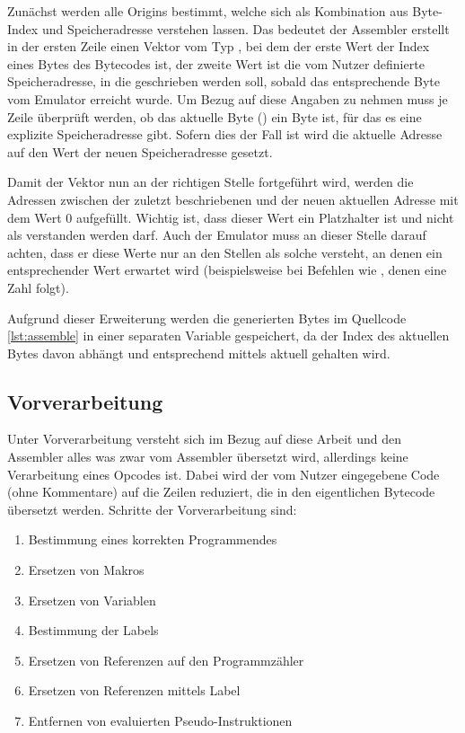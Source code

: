 Zunächst werden alle Origins bestimmt, welche sich als Kombination aus Byte-Index und Speicheradresse verstehen lassen. Das bedeutet der Assembler erstellt in der ersten Zeile einen Vektor vom Typ , bei dem der erste Wert der Index eines Bytes des Bytecodes ist, der zweite Wert ist die vom Nutzer definierte Speicheradresse, in die geschrieben werden soll, sobald das entsprechende Byte vom Emulator erreicht wurde. Um Bezug auf diese Angaben zu nehmen muss je Zeile überprüft werden, ob das aktuelle Byte () ein Byte ist, für das es eine explizite Speicheradresse gibt. Sofern dies der Fall ist wird die aktuelle Adresse auf den Wert der neuen Speicheradresse gesetzt. 

Damit der Vektor nun an der richtigen Stelle fortgeführt wird, werden die Adressen zwischen der zuletzt beschriebenen und der neuen aktuellen Adresse mit dem Wert 0 aufgefüllt. Wichtig ist, dass dieser Wert ein Platzhalter ist und nicht als \grqq{} verstanden werden darf. Auch der Emulator muss an dieser Stelle darauf achten, dass er diese Werte nur an den Stellen als solche versteht, an denen ein entsprechender Wert erwartet wird (beispielsweise bei Befehlen wie , denen eine Zahl folgt).

Aufgrund dieser Erweiterung werden die generierten Bytes im Quellcode \ref{lst:assemble} in einer separaten Variable gespeichert, da der Index des aktuellen Bytes davon abhängt und entsprechend mittels
aktuell gehalten wird.

\subsection{Vorverarbeitung}\label{chap:preprocessor}

Unter Vorverarbeitung versteht sich im Bezug auf diese Arbeit und den Assembler alles was zwar vom Assembler übersetzt wird, allerdings keine Verarbeitung eines Opcodes ist. Dabei wird der vom Nutzer eingegebene Code (ohne Kommentare) auf die Zeilen reduziert, die in den eigentlichen Bytecode übersetzt werden. Schritte der Vorverarbeitung sind:

\begin{enumerate}
	\item Bestimmung eines korrekten Programmendes
	\item Ersetzen von Makros
	\item Ersetzen von Variablen
	\item Bestimmung der Labels
	\item Ersetzen von Referenzen auf den Programmzähler
	\item Ersetzen von Referenzen mittels Label
	\item Entfernen von evaluierten Pseudo-Instruktionen
\end{enumerate}

